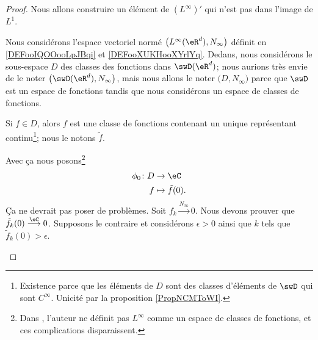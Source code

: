 \begin{proof}
Nous allons construire un élément de \( (L^{\infty})'\) qui n'est pas dans l'image de \( L^1\).

\begin{subproof}
    Nous considérons l'espace vectoriel normé \( \big( L^{\infty}(\eR^d), N_{\infty} \big)\) définit en \ref{DEFooIQOOooLpJBqi} et \ref{DEFooXUKHooXYrlYq}. Dedans, nous considérons le sous-espace \( D\) des classes des fonctions dans \( \swD(\eR^d)\); nous aurions très envie de le noter \( \big( \swD(\eR^d), N_{\infty} \big)\), mais nous allons le noter \( \big( D,N_{\infty} \big)\) parce que \( \swD\) est un espace de fonctions tandis que nous considérons un espace de classes de fonctions.

    Si \( f\in D\), alors \( f\) est une classe de fonctions contenant un unique représentant continu\footnote{Existence parce que les éléments de \( D\) sont des classes d'éléments de \( \swD\) qui sont \(  C^{\infty}\). Unicité par la proposition \ref{PropNCMToWI}.}; nous le notons \( \tilde f\).


    Avec ça nous posons\footnote{Dans \cite{BIBooFDGQooYferue}, l'auteur ne définit pas \( L^{\infty}\) comme un espace de classes de fonctions, et ces complications disparaissent.}
    \begin{equation}
        \begin{aligned}
            \phi_0\colon D & \to \eC              \\
            f              & \mapsto \tilde f(0).
        \end{aligned}
    \end{equation}
    Ça ne devrait pas poser de problèmes.
    Soit \( f_k\stackrel{N_{\infty}}{\longrightarrow}0\). Nous devons prouver que \( \tilde f_k(0)\stackrel{\eC}{\longrightarrow}0\). Supposons le contraire et considérons \( \epsilon>0\) ainsi que \( k\) tels que \( \tilde f_k(0)>\epsilon\).


\end{subproof}
\end{proof}
